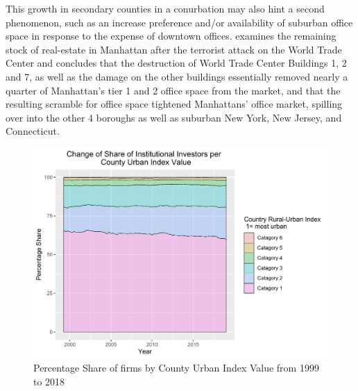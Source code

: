 This growth in secondary counties in a conurbation may also hint a second phenomenon, such as an increase preference and/or availability of suburban office space in response to the expense of downtown offices.  \cite{Pohl2004} examines the remaining stock of real-estate in Manhattan after the terrorist attack on the World Trade Center and concludes that the destruction of World Trade Center Buildings 1, 2 and 7, as well as the damage on the other buildings essentially removed nearly a quarter of Manhattan's tier 1 and 2 office space from the market, and that the resulting scramble for office space tightened Manhattans' office market, spilling over into the other 4 boroughs as well as suburban New York, New Jersey, and Connecticut.  



\begin{figure}
	\centering
	\includegraphics[width=1\linewidth]{Figures/ChapterIII/ChangeInRelativeNumberRuralUrban}
	\caption[Relative Numbers of Institutional Investors Over Time by County Urban-Rural Index]{Percentage Share of firms by County Urban Index Value from 1999 to 2018}
	\label{fig:changeinrelativenumberruralurban}
\end{figure}

